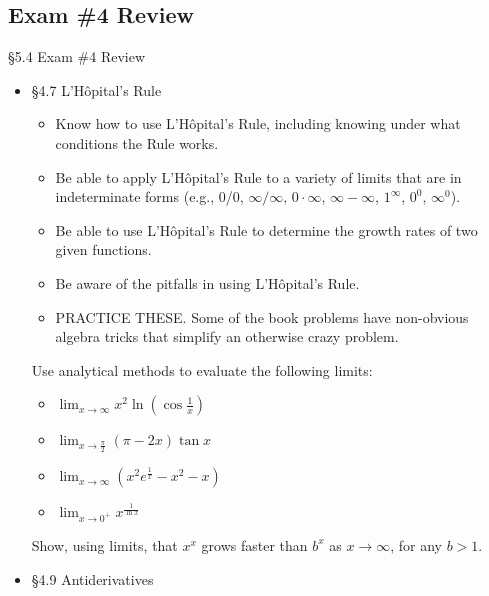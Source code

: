 \documentclass[cal1spr16Lectures.tex]{subfiles}
\begin{document}

\subsection[Exam \#4 Review]{Exam \#4 Review}

\begin{frame}[allowframebreaks]{\S 5.4 Exam \#4 Review}\small
\begin{itemize}
\item \S 4.7 L'H\^opital's Rule
	\begin{itemize}\footnotesize
	\item Know how to use L'H\^{o}pital's Rule, including knowing under what conditions the Rule works.
	\item Be able to apply L'H\^{o}pital's Rule to a variety of limits that are in indeterminate forms (e.g., 0/0, $\infty/\infty$, $0 \cdot \infty$, $\infty-\infty$, $1^{\infty}$, $0^0$, $\infty^0$).
	\item Be able to use L'H\^{o}pital's Rule to determine the growth rates of two given functions.
	\item Be aware of the pitfalls in using L'H\^{o}pital's Rule.
%
\framebreak	
	\item \alert{PRACTICE THESE.}  Some of the book problems have non-obvious algebra tricks that simplify an otherwise crazy problem.
	\end{itemize}
\begin{exe}[s]
Use analytical methods to evaluate the following limits:
\begin{itemize}
\item[(1)] $\lim_{x\to\infty}x^2\ln\left(\cos{\frac{1}{x}}\right)$
\item[(2)] $\lim_{x\to\frac{\pi}{2}}(\pi-2x)\tan x$
\item[(3)] $\lim_{x\to\infty}(x^2e^{\frac{1}{x}}-x^2-x)$
\item[(4)] $\lim_{x\to 0^+}x^{\frac{1}{\ln x}}$
\end{itemize}
\end{exe}	
%
\framebreak	
\begin{exe}
Show, using limits, that $x^x$ grows faster than $b^x$ as $x\to\infty$, for any $b>1$.
\end{exe}
\item \S 4.9 Antiderivatives
	\begin{itemize}\footnotesize

\end{itemize}
\end{itemize}
\end{frame}
\end{document}
